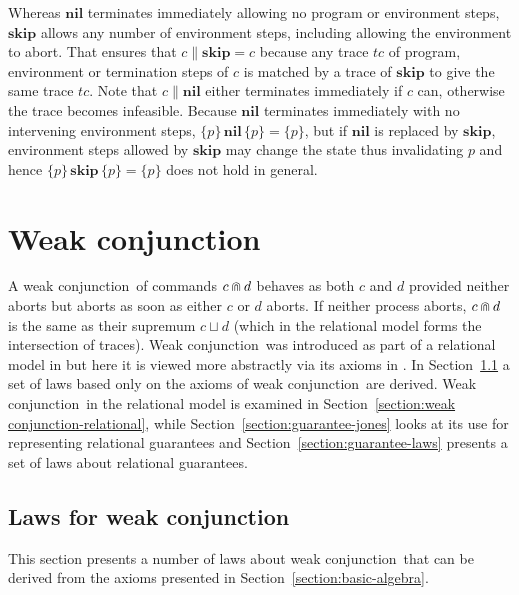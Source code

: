 \documentclass[fleqn]{fac}
\newcommand{\Pre}[1]{\{#1\}}
\newcommand{\SSeq}{\,}
\newcommand{\Nil}{\Keyword{nil}}
\newcommand{\angelic}{\mathbin{\sqcup}}
\newcommand{\strictconjunction}{weak conjunction}
\newcommand{\Strictconjunction}{Weak conjunction}
\newcommand{\together}{\mathbin{\doublecap}}
\newcommand{\Keyword}[1]{\mathsf{\mathbf{#1}}}
\newcommand{\Skip}{\Keyword{skip}}
\begin{document}
Whereas $\Nil$ terminates immediately allowing no program or environment steps,
$\Skip$ allows any number of environment steps, including allowing the environment to abort.
That ensures that $c \parallel \Skip = c$ because 
any trace $tc$ of program, environment or termination steps of $c$ is matched by 
a trace of $\Skip$ to give the same trace $tc$.
Note that $c \parallel \Nil$ either terminates immediately if $c$ can,
otherwise the trace becomes infeasible.
Because $\Nil$ terminates immediately with no intervening environment steps,
$\Pre{p} \SSeq \Nil \SSeq \Pre{p} = \Pre{p}$,
but if $\Nil$ is replaced by $\Skip$,
environment steps allowed by $\Skip$ may change the state thus invalidating $p$
and hence $\Pre{p} \SSeq \Skip \SSeq \Pre{p} = \Pre{p}$ does not hold in general.



\section{\Strictconjunction}\label{section:conjunction}

A \strictconjunction\ of commands $c \together d$ behaves as both $c$ and $d$
provided neither aborts but aborts as soon as either $c$ or $d$ aborts.
If neither process aborts, $c \together d$ is the same as their supremum $c \angelic d$
(which in the relational model forms the intersection of traces).
\Strictconjunction\ was introduced as part of a relational model in \cite{HayesJonesColvin14TR}
but here it is viewed more abstractly via its axioms in .
In Section~\ref{section:conjunction-algebra} a set of laws based only on the axioms
of \strictconjunction\ are derived.
\Strictconjunction\  in the relational model is examined in Section~\ref{section:\strictconjunction-relational},
while Section~\ref{section:guarantee-jones} looks at its use for representing relational guarantees
and Section~\ref{section:guarantee-laws} presents a set of laws about relational guarantees.





\subsection{Laws for \strictconjunction}\label{section:conjunction-algebra}

This section presents a number of laws about \strictconjunction\ 
that can be derived from the axioms presented in Section~\ref{section:basic-algebra}.
\end{document}
